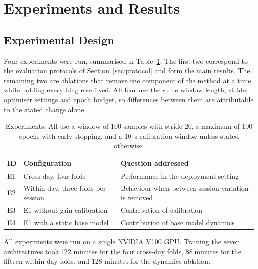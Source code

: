 %
\section{Experiments and Results}
\label{sec:results}

\subsection{Experimental Design}
\label{sec:design}

Four experiments were run, summarised in Table~\ref{tab:experiments}. The first
two correspond to the evaluation protocols of Section~\ref{sec:protocol} and
form the main results. The remaining two are ablations that remove one component
of the method at a time while holding everything else fixed. All four use the
same window length, stride, optimiser settings and epoch budget, so differences
between them are attributable to the stated change alone.

\begin{table}[!t]
\caption{Experiments. All use a window of 100 samples with stride 20, a maximum
of 100 epochs with early stopping, and a \SI{10}{\second} calibration window
unless stated otherwise.}
\label{tab:experiments}
\centering
\begin{tabular}{llp{3.0cm}}
\toprule
ID & Configuration & Question addressed \\
\midrule
E1 & Cross-day, four folds & Performance in the deployment setting \\
E2 & Within-day, three folds per session & Behaviour when between-session variation is removed \\
E3 & E1 without gain calibration & Contribution of calibration \\
E4 & E1 with a static base model & Contribution of base model dynamics \\
\bottomrule
\end{tabular}
\end{table}

All experiments were run on a single NVIDIA V100 GPU. Training the seven
architectures took 122 minutes for the four cross-day folds, 88 minutes for the
fifteen within-day folds, and 128 minutes for the dynamics ablation.

